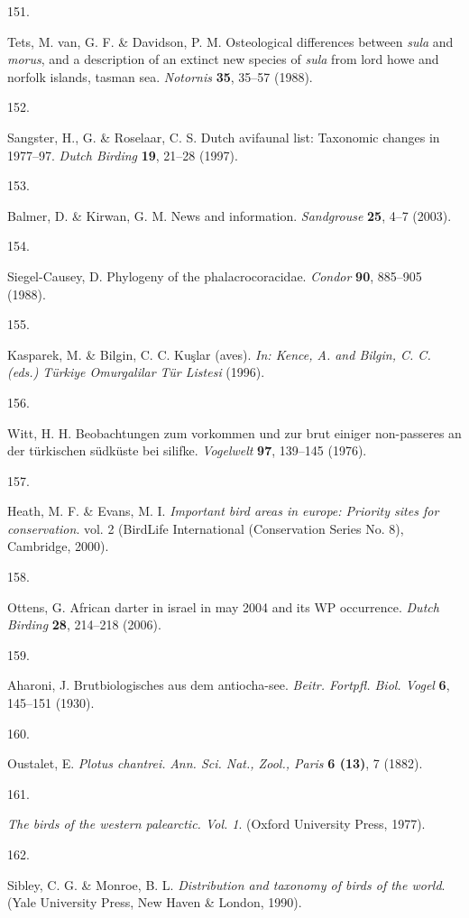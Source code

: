 \documentclass[
  letterpaper,
  DIV=11,
  numbers=noendperiod]{scrreprt}
\newlength{\cslhangindent}
\newlength{\csllabelwidth}
\newenvironment{CSLReferences}[2] %
 {\begin{list}{}{%
  \setlength{\itemindent}{0pt}
  \setlength{\leftmargin}{0pt}
  \setlength{\parsep}{0pt}
  \ifodd #1
   \setlength{\leftmargin}{\cslhangindent}
   \setlength{\itemindent}{-1\cslhangindent}
  \fi
  \setlength{\itemsep}{#2\baselineskip}}}
 {\end{list}}
\newcommand{\CSLLeftMargin}[1]{\parbox[t]{\csllabelwidth}{\strut#1\strut}}
\newcommand{\CSLRightInline}[1]{\parbox[t]{\linewidth - \csllabelwidth}{\strut#1\strut}}
\begin{document}
\begin{CSLReferences}{0}{0}
\CSLLeftMargin{151. }%
\CSLRightInline{Tets, M. van, G. F. \& Davidson, P. M. Osteological
differences between \emph{sula} and \emph{morus}, and a description of
an extinct new species of \emph{sula} from lord howe and norfolk
islands, tasman sea. \emph{Notornis} \textbf{35}, 35--57 (1988).}

\CSLLeftMargin{152. }%
\CSLRightInline{Sangster, H., G. \& Roselaar, C. S. Dutch avifaunal
list: Taxonomic changes in 1977--97. \emph{Dutch Birding} \textbf{19},
21--28 (1997).}

\CSLLeftMargin{153. }%
\CSLRightInline{Balmer, D. \& Kirwan, G. M. News and information.
\emph{Sandgrouse} \textbf{25}, 4--7 (2003).}

\CSLLeftMargin{154. }%
\CSLRightInline{Siegel-Causey, D. Phylogeny of the phalacrocoracidae.
\emph{Condor} \textbf{90}, 885--905 (1988).}

\CSLLeftMargin{155. }%
\CSLRightInline{Kasparek, M. \& Bilgin, C. C. Kuşlar (aves). \emph{In:
Kence, A. and Bilgin, C. C. (eds.) Türkiye Omurgalilar Tür Listesi}
(1996).}

\CSLLeftMargin{156. }%
\CSLRightInline{Witt, H. H. Beobachtungen zum vorkommen und zur brut
einiger non-passeres an der türkischen südküste bei silifke.
\emph{Vogelwelt} \textbf{97}, 139--145 (1976).}

\CSLLeftMargin{157. }%
\CSLRightInline{Heath, M. F. \& Evans, M. I. \emph{Important bird areas
in europe: Priority sites for conservation}. vol. 2 (BirdLife
International (Conservation Series No. 8), Cambridge, 2000).}

\CSLLeftMargin{158. }%
\CSLRightInline{Ottens, G. African darter in israel in may 2004 and its
WP occurrence. \emph{Dutch Birding} \textbf{28}, 214--218 (2006).}

\CSLLeftMargin{159. }%
\CSLRightInline{Aharoni, J. Brutbiologisches aus dem antiocha-see.
\emph{Beitr. Fortpfl. Biol. Vogel} \textbf{6}, 145--151 (1930).}

\CSLLeftMargin{160. }%
\CSLRightInline{Oustalet, E. \emph{Plotus chantrei.} \emph{Ann. Sci.
Nat., Zool., Paris} \textbf{6 (13)}, 7 (1882).}

\CSLLeftMargin{161. }%
\CSLRightInline{\emph{The birds of the western palearctic. Vol. 1}.
(Oxford University Press, 1977).}

\CSLLeftMargin{162. }%
\CSLRightInline{Sibley, C. G. \& Monroe, B. L. \emph{Distribution and
taxonomy of birds of the world}. (Yale University Press, New Haven \&
London, 1990).}

\end{CSLReferences}
\end{document}
